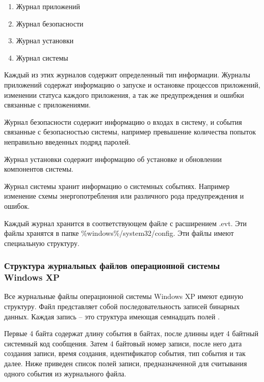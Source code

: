 \begin{enumerate}
\item Журнал приложений
\item Журнал безопасности
\item Журнал установки
\item Журнал системы
\end{enumerate}

Каждый из этих журналов содержит определенный тип информации. Журналы приложений содержат информацию о запуске и остановке процессов приложений, изменении статуса каждого приложения, а так же предупреждения и ошибки связанные с приложениями.

Журнал безопасности содержит информацию о входах в систему, и события связанные с безопасностью системы, например превышение количества попыток неправильно введенных подряд паролей.

Журнал установки содержит информацию об установке и обновлении компонентов системы.

Журнал системы хранит информацию о системных событиях. Например изменение схемы энергопотребления или различного рода предупреждения и ошибок.

Каждый журнал хранится в соответствующем файле с расширением .evt. Эти файлы хранятся в папке \%windows\%/system32/config. Эти файлы имеют специальную структуру.

\subsubsection{Структура журнальных файлов операционной системы Windows XP}

Все журнальные файлы операционной системы Windows XP имеют единую структуру. Файл представляет собой последовательность записей бинарных данных. Каждая запись – это структура имеющая семнадцать полей \cite{evt}.

Первые 4 байта содержат длину события в байтах, после длинны идет 4 байтный системный код сообщения. Затем 4 байтовый номер записи, после него дата создания записи, время создания, идентификатор события, тип события и так далее. Ниже приведен список полей записи, предназначенной для считывания одного события из журнального файла.

